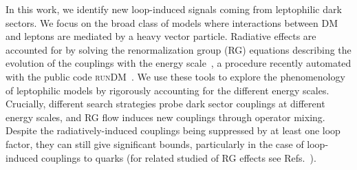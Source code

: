\documentclass[final,5p,twocolumn]{elsarticle}
\newcommand{\runDM}{\textsc{runDM}\xspace}
\begin{document}
In this work, we identify new loop-induced signals coming from leptophilic dark sectors. We focus on the broad class of models where interactions between DM and leptons are mediated by a heavy vector particle. Radiative effects are accounted for by solving the renormalization group (RG) equations describing the evolution of the couplings with the energy scale~\cite{Crivellin:2014qxa,D'Eramo:2014aba}, a procedure recently automated with the public code \runDM~\cite{D'Eramo:2016atc,runDM}. We use these tools to explore the phenomenology of leptophilic models by rigorously accounting for the different energy scales.  Crucially, different search strategies probe dark sector couplings at different energy scales, and RG flow induces new couplings through operator mixing. Despite the radiatively-induced couplings being suppressed by at least one loop factor, they can still give significant bounds, particularly in the case of loop-induced couplings to quarks (for related studied of RG effects see Refs.~\cite{Hill:2011be,Frandsen:2012db,Haisch:2013uaa,Hill:2013hoa,Kopp:2014tsa,Crivellin:2014gpa,Hill:2014yxa,D'Eramo:2016mgv}).
\end{document}
